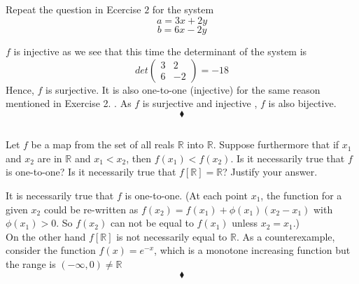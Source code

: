 \subsection{}
\begin{tcolorbox}
Repeat the question in Ecercise $2$ for the system
$$a= 3x+ 2y$$
$$b= 6x-2y$$
\end{tcolorbox}
$f$ is injective as we see that this time the determinant of the system is  $$det\left(\begin{matrix}3&2\\6&-2\end{matrix}\right) =-18$$
Hence, $f$ is surjective. It is also one-to-one (injective) for the same reason mentioned in Exercise 2. . As $f$ is  surjective and injective , $f$ is also bijective.
$$\blacklozenge$$

\subsection{}
\begin{tcolorbox}
Let $f$ be a map from the set of all reals $\mathbb{R}$ into $\mathbb{R}$. Suppose furthermore that if $x_1$ and $x_2$ are in $\mathbb{R}$ and $x_1 < x_2$, then  $f(x_1) < f(x_2)$. Is it necessarily true that $f$ is one-to-one? Is it necessarily true that $f[\mathbb{R}]= \mathbb{R}$? Justify your answer.
\end{tcolorbox}
It is necessarily true that $f$ is one-to-one. (At each point $x_1$, the function for a given $x_2$ could be re-written as $f(x_2)= f(x_1) + \phi(x_1)(x_2-x_1)$ with $\phi(x_1)>0$. So $f(x_2)$ can not be equal to $f(x_1)$ unless $x_2=x_1$.)\\
On the other hand $f[\mathbb{R}]$ is not necessarily equal to $ \mathbb{R}$. As a counterexample, consider the function $f(x)= e^{-x}$, which is a monotone increasing function but the range is $(-\infty,0)\ne \mathbb{R}$
$$\blacklozenge$$

